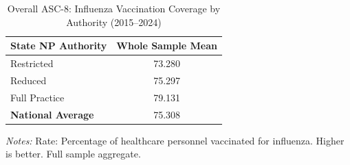\begin{table}[htbp]
    \centering
    \caption{Overall ASC-8: Influenza Vaccination Coverage by Authority (2015--2024)}
    \label{tab:asc_rate_8_full}
    \vspace{0.2cm}
    \begin{tabular}{lc}
        \toprule
        \textbf{State NP Authority} & \textbf{Whole Sample Mean} \\
        \midrule
        Restricted & 73.280 \\
        Reduced & 75.297 \\
        Full Practice & 79.131 \\
        \midrule
        \textbf{National Average} & 75.308 \\
        \bottomrule
    \end{tabular}
    \vspace{0.1cm}
    \begin{minipage}{0.6\textwidth}
        \footnotesize \textit{Notes:} Rate: Percentage of healthcare personnel vaccinated for influenza. Higher is better. Full sample aggregate.
    \end{minipage}
\end{table}
